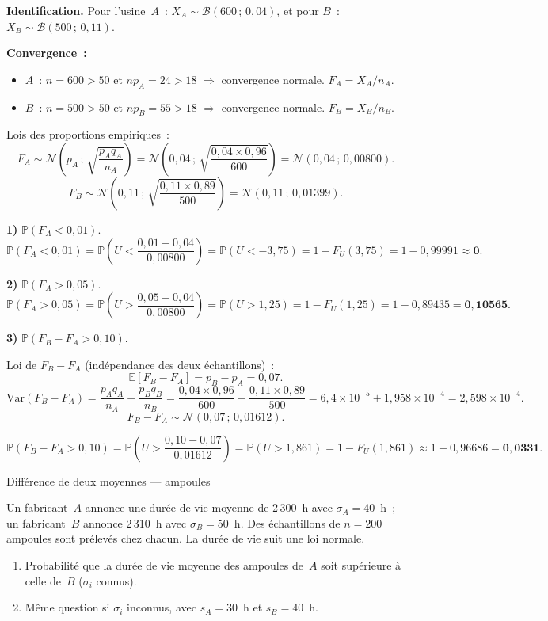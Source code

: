 \documentclass[11pt,a4paper]{article}
\newcommand{\N}{\mathcal{N}}
\newcommand{\B}{\mathcal{B}}
\newcommand{\E}{\mathbb{E}}
\newcommand{\Var}{\mathrm{Var}}
\newcommand{\Prob}{\mathbb{P}}
\renewcommand{\P}{\Prob}
\newcommand{\corrsep}{\vspace{4pt}{\color{rulecol}\hrule height 0.6pt}\vspace{6pt}}
\begin{document}
\corrsep

\textbf{Identification.} Pour l'usine~$A$~: $X_A \sim \B(600\,;\,0{,}04)$, et pour $B$~: $X_B \sim \B(500\,;\,0{,}11)$.

\textbf{Convergence~:}
\begin{itemize}
  \item $A$~: $n=600>50$ et $np_A=24>18$ $\Rightarrow$ convergence normale. $F_A = X_A/n_A$.
  \item $B$~: $n=500>50$ et $np_B=55>18$ $\Rightarrow$ convergence normale. $F_B = X_B/n_B$.
\end{itemize}

Lois des proportions empiriques~:
$$F_A \sim \N\!\left(p_A\,;\,\sqrt{\frac{p_Aq_A}{n_A}}\right)
  = \N\!\left(0{,}04\,;\,\sqrt{\frac{0{,}04\times0{,}96}{600}}\right) = \N(0{,}04\,;\,0{,}00800).$$
$$F_B \sim \N\!\left(0{,}11\,;\,\sqrt{\frac{0{,}11\times0{,}89}{500}}\right) = \N(0{,}11\,;\,0{,}01399).$$

\medskip
\textbf{1)} $\P(F_A < 0{,}01)$.
$$\P(F_A<0{,}01) = \P\!\left(U < \frac{0{,}01-0{,}04}{0{,}00800}\right) = \P(U < -3{,}75)
  = 1-F_U(3{,}75) = 1-0{,}99991 \approx \mathbf{0}.$$

\textbf{2)} $\P(F_A > 0{,}05)$.
$$\P(F_A>0{,}05) = \P\!\left(U > \frac{0{,}05-0{,}04}{0{,}00800}\right) = \P(U>1{,}25)
  = 1-F_U(1{,}25) = 1-0{,}89435 = \mathbf{0{,}10565}.$$

\textbf{3)} $\P(F_B-F_A > 0{,}10)$.

Loi de $F_B-F_A$ (ind\'ependance des deux \'echantillons)~:
$$\E[F_B-F_A] = p_B-p_A = 0{,}07.$$
$$\Var(F_B-F_A) = \frac{p_Aq_A}{n_A}+\frac{p_Bq_B}{n_B}
  = \frac{0{,}04\times0{,}96}{600}+\frac{0{,}11\times0{,}89}{500} = 6{,}4\times10^{-5}+1{,}958\times10^{-4} = 2{,}598\times10^{-4}.$$
$$F_B-F_A \sim \N(0{,}07\,;\,0{,}01612).$$

$$\P(F_B-F_A>0{,}10) = \P\!\left(U>\frac{0{,}10-0{,}07}{0{,}01612}\right)
  = \P(U>1{,}861) = 1-F_U(1{,}861) \approx 1-0{,}96686 = \mathbf{0{,}0331}.$$

\begin{exercice}{Diff\'erence de deux moyennes --- ampoules}

Un fabricant~$A$ annonce une dur\'ee de vie moyenne de 2\,300~h avec $\sigma_A=40$~h~; un fabricant~$B$ annonce 2\,310~h avec $\sigma_B=50$~h. Des \'echantillons de $n=200$ ampoules sont pr\'elev\'es chez chacun. La dur\'ee de vie suit une loi normale.

\begin{enumerate}
  \item Probabilit\'e que la dur\'ee de vie moyenne des ampoules de~$A$ soit sup\'erieure \`a celle de~$B$ ($\sigma_i$ connus).
  \item M\^eme question si $\sigma_i$ inconnus, avec $s_A=30$~h et $s_B=40$~h.
\end{enumerate}
\end{exercice}
\end{document}
